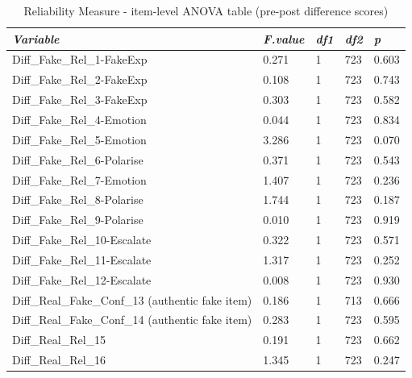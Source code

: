 \documentclass[empirical, authordate]{jote-new-article}
\begin{document}
\begin{table}

  \caption{Reliability Measure - item-level ANOVA table (pre-post difference scores)}
  \label{tab:tableS26}


  \begin{tabularx}{\linewidth}{@{} l  l  l  l  l@{}}
    \toprule

    \emph{Variable}                                  & \emph{F.value} & \emph{df1} & \emph{df2} & \emph{p} \\
    \midrule
    Diff\_Fake\_Rel\_1-FakeExp                       & 0.271          & 1          & 723        & 0.603    \\
    Diff\_Fake\_Rel\_2-FakeExp                       & 0.108          & 1          & 723        & 0.743    \\
    Diff\_Fake\_Rel\_3-FakeExp                       & 0.303          & 1          & 723        & 0.582    \\
    Diff\_Fake\_Rel\_4-Emotion                       & 0.044          & 1          & 723        & 0.834    \\
    Diff\_Fake\_Rel\_5-Emotion                       & 3.286          & 1          & 723        & 0.070    \\
    Diff\_Fake\_Rel\_6-Polarise                      & 0.371          & 1          & 723        & 0.543    \\
    Diff\_Fake\_Rel\_7-Emotion                       & 1.407          & 1          & 723        & 0.236    \\
    Diff\_Fake\_Rel\_8-Polarise                      & 1.744          & 1          & 723        & 0.187    \\
    Diff\_Fake\_Rel\_9-Polarise                      & 0.010          & 1          & 723        & 0.919    \\
    Diff\_Fake\_Rel\_10-Escalate                     & 0.322          & 1          & 723        & 0.571    \\
    Diff\_Fake\_Rel\_11-Escalate                     & 1.317          & 1          & 723        & 0.252    \\
    Diff\_Fake\_Rel\_12-Escalate                     & 0.008          & 1          & 723        & 0.930    \\
    Diff\_Real\_Fake\_Conf\_13 (authentic fake item) & 0.186          & 1          & 713        & 0.666    \\
    Diff\_Real\_Fake\_Conf\_14 (authentic fake item) & 0.283          & 1          & 723        & 0.595    \\
    Diff\_Real\_Rel\_15                              & 0.191          & 1          & 723        & 0.662    \\
    Diff\_Real\_Rel\_16                              & 1.345          & 1          & 723        & 0.247    \\
    \bottomrule
  \end{tabularx}


\end{table}
\end{document}

